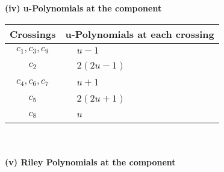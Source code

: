 \documentclass[1p]{elsarticle_modified}
\theoremstyle{definition}
\begin{document}
\newpage\renewcommand{\arraystretch}{1}
\flushleft \textbf{(iv) u-Polynomials at the component}\newline \\
\begin{tabular}{m{50pt}|m{274pt}}
Crossings & \hspace{64pt}u-Polynomials at each crossing \\
\hline $$\begin{aligned}c_{1},c_{3},c_{9}\end{aligned}$$&$\begin{aligned}
&u-1
\end{aligned}$\\
\hline $$\begin{aligned}c_{2}\end{aligned}$$&$\begin{aligned}
&2(2 u-1)
\end{aligned}$\\
\hline $$\begin{aligned}c_{4},c_{6},c_{7}\end{aligned}$$&$\begin{aligned}
&u+1
\end{aligned}$\\
\hline $$\begin{aligned}c_{5}\end{aligned}$$&$\begin{aligned}
&2(2 u+1)
\end{aligned}$\\
\hline $$\begin{aligned}c_{8}\end{aligned}$$&$\begin{aligned}
&u
\end{aligned}$\\
\hline
\end{tabular}\\~\\
\newpage\renewcommand{\arraystretch}{1}
\flushleft \textbf{(v) Riley Polynomials at the component}\newline \\
\end{document}
